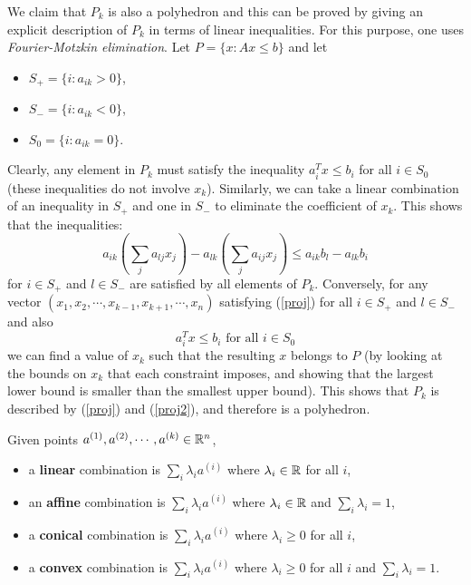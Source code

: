 \documentclass[12pt]{article}
\begin{document}
We claim that $P_k$ is also a polyhedron and this can be proved by
giving an explicit description of $P_k$ in terms of linear
inequalities. For this purpose, one uses {\it Fourier-Motzkin elimination}. 
Let $P=\{x: Ax\leq b\}$ and let
\begin{itemize}
\item
$S_+=\{i: a_{ik} >0\}$,
\item
$S_-=\{i: a_{ik}<0\}$,
\item
$S_0=\{i:a_{ik}=0\}$.
\end{itemize}
%
Clearly, any element in $P_k$ must satisfy the inequality $a_i^Tx\leq
b_i$ for all $i\in S_0$ (these inequalities do not involve $x_k$).
Similarly, we can take a linear combination of an inequality in $S_+$
and one in $S_-$ to eliminate the coefficient of $x_k$. This shows
that the inequalities:
%
\begin{equation} \label{proj}
a_{ik} \left(\sum_j a_{lj}x_j \right) -a_{lk} \left(\sum_j a_{ij}
x_j\right) \leq a_{ik} b_l - a_{lk} b_i 
\end{equation}
for $i\in S_+$ and $l\in S_-$ are satisfied by all elements of
$P_k$. Conversely, for any vector
$(x_1,x_2,\cdots,x_{k-1},x_{k+1},\cdots, x_n)$ satisfying (\ref{proj})
for all $i\in S_+$ and $l\in S_-$ and also 
\begin{equation} \label{proj2}
a_i^Tx\leq b_i \mbox{ for all } i\in S_0
\end{equation}
 we can find a value of $x_k$ such that the resulting $x$ belongs to
 $P$ (by looking at the bounds on $x_k$ that each constraint imposes,
 and showing that the largest lower bound is smaller than the smallest
 upper bound). This shows that $P_k$ is described by (\ref{proj}) and
 (\ref{proj2}), and therefore is a polyhedron. 

\begin{definition}
Given points $a^{(1)}, a^{(2)}, \cdots, a^{(k)}\in {\mathbb R}^n$, 
\begin{itemize}
\item
a {\bf linear} combination is  $\sum_i \lambda_i a^{(i)}$ where
$\lambda_i\in {\mathbb R}$ for all $i$,
\item
an {\bf affine} combination is  $\sum_i \lambda_i a^{(i)}$ where
$\lambda_i\in {\mathbb R}$ and $\sum_i \lambda_i=1$,
\item
a {\bf conical} combination is  $\sum_i \lambda_i a^{(i)}$ where
$\lambda_i\geq 0$ for all $i$,
\item
a {\bf convex} combination is  $\sum_i \lambda_i a^{(i)}$ where
$\lambda_i \geq 0$ for all $i$ and $\sum_i \lambda_i=1$.
\end{itemize}
\end{definition}
\end{document}
